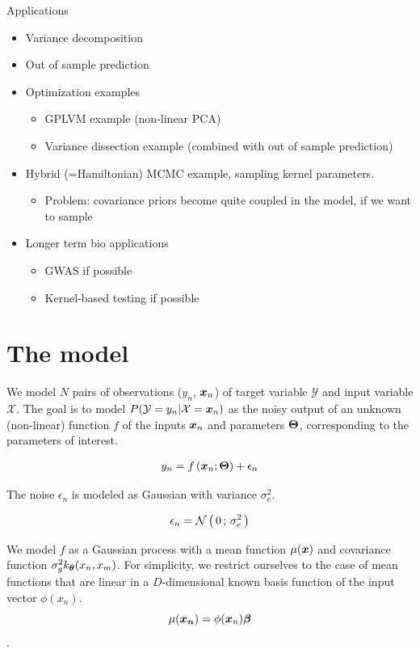 \documentclass[twoside]{article}
\newcommand{\TODO}[1]{{\color{MyRed}\fbox{TODO} #1}}
\begin{document}
\TODO{

Applications
\begin{itemize}
\item Variance decomposition
\item Out of sample prediction
\item Optimization examples
\begin{itemize}
\item GPLVM example (non-linear PCA)
\item Variance dissection example (combined with out of sample prediction)
\end{itemize}
\item Hybrid (=Hamiltonian) MCMC example, sampling kernel parameters. 
\begin{itemize}
\item Problem: covariance priors become quite coupled in the model, if we want to sample
\end{itemize}
\item Longer term bio applications
\begin{itemize}
\item GWAS if possible
\item Kernel-based testing if possible
\end{itemize}
\end{itemize}
}

\section{The model}
\label{sec:model}

We model $N$ pairs of observations ($y_n$, $\bm{x}_n$) of target variable $\mathcal{Y}$ and input variable $\mathcal{X}$. The goal is to model $P(\mathcal{Y} = y_n| \mathcal{X}=\bm{x}_n)$ 
as the noisy output of an unknown (non-linear) function $f$ of the inputs $\bm{x}_n$ and parameters $\bm{\Theta}$, corresponding to the parameters of interest.

\begin{align*}
{y}_n = f\left(\bm{x}_n; \bm{\Theta} \right) + \epsilon_n
\end{align*}

The noise $\epsilon_n$ is modeled as \iid Gaussian with variance $\sigma_e^2$.

\begin{align*}
{\epsilon}_n = \mathcal{N}\left(\, {0} \,;\, {\sigma_e^2} \,\right)
\end{align*}

We model $f$ as a Gaussian process with a mean function $\mu(\bm{x})$ and covariance function $\sigma_g^2k_{\bm{\theta}}(x_n,x_m)$.
For simplicity, we restrict ourselves to the case of mean functions that are linear in a $D$-dimensional known basis function of the input vector $\phi(x_n)$.
$$\mu(\bm{x_n}) = \phi(\bm{x}_n)\bm{\beta}$$.
\end{document}
